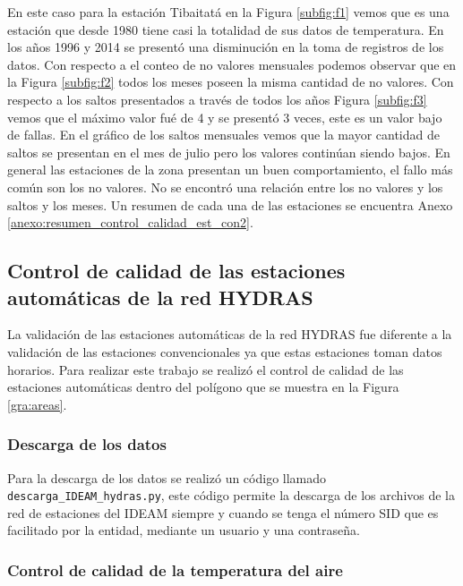En este caso para la estación Tibaitatá en la Figura \ref{subfig:f1} vemos que es una estación que desde 1980 tiene casi la totalidad de sus datos de temperatura. En los años 1996 y 2014 se presentó una disminución en la toma de registros de los datos. Con respecto a el conteo de no valores mensuales podemos observar que en la Figura \ref{subfig:f2} todos los meses poseen la misma cantidad de no valores. Con respecto a los saltos presentados a través de todos los años Figura \ref{subfig:f3} vemos que el máximo valor fué de 4 y se presentó 3 veces, este es un valor bajo de fallas. En el gráfico de los saltos mensuales vemos que la mayor cantidad de saltos se presentan en el mes de julio pero los valores continúan siendo bajos. En general las estaciones de la zona presentan un buen comportamiento, el fallo más común son los no valores. No se encontró una relación entre los no valores y los saltos y los meses. Un resumen de cada una de las estaciones se encuentra Anexo \ref{anexo:resumen_control_calidad_est_con2}.

\subsection{Control de calidad de las estaciones automáticas de la red HYDRAS}

La validación de las estaciones automáticas de la red HYDRAS fue diferente a la validación de las estaciones convencionales ya que estas estaciones toman datos horarios. Para realizar este trabajo se realizó el control de calidad de las estaciones automáticas dentro del polígono que se muestra en la Figura \ref{gra:areas}.

\subsubsection{Descarga de los datos}
Para la descarga de los datos se realizó un código llamado \texttt{descarga\_IDEAM\_hydras.py}, este código permite la descarga de los archivos de la red de estaciones del IDEAM siempre y cuando se tenga el número SID que es facilitado por la entidad, mediante un usuario y una contraseña.

\subsubsection{Control de calidad de la temperatura del aire}

